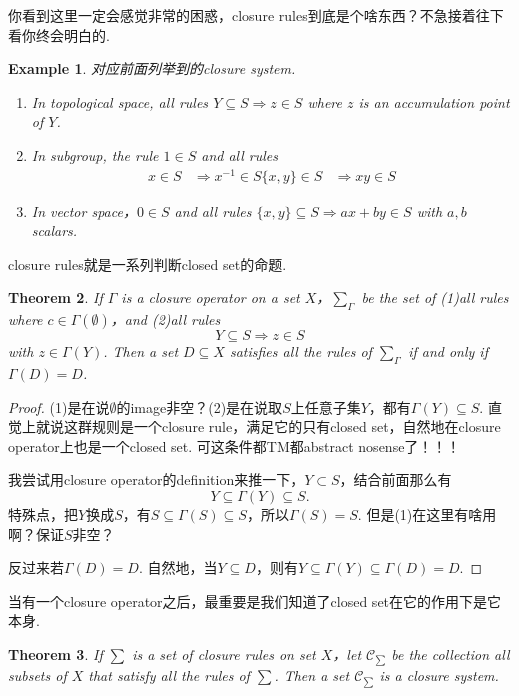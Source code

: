 \documentclass{article}
\newtheorem{theorem}{Theorem}[section]
\newtheorem{example}[theorem]{Example}
\begin{document}
{\color{blue} 你看到这里一定会感觉非常的困惑，closure rules到底是个啥东西？不急接着往下看你终会明白的}.

\begin{example}
\rm 对应前面列举到的closure system.
\begin{enumerate}
	\item In topological space, all rules $Y \subseteq S \Rightarrow z \in S$ where $z$ is an accumulation point of $Y$.  
	\item In subgroup, the rule $1 \in S$ and all rules
	$$
		\begin{aligned}
			x \in S &\Rightarrow x^{-1} \in S
			\{x,y\} \in S &\Rightarrow xy \in S
		\end{aligned}
	$$
	\item In vector space，$0 \in S$ and all rules $\{x,y\} \subseteq S \Rightarrow ax + by \in S$ with $a,b$ scalars. 
\end{enumerate}
\end{example}

{\color{red} closure rules就是一系列判断closed set的命题}.

\begin{theorem}
\rm {\color{red} If $\Gamma$ is a closure operator on a set $X$}，$\sum_{\Gamma}$ be the set of (1)all rules where $c \in \Gamma(\emptyset)$，and (2)all rules
$$
Y \subseteq  S \Rightarrow z \in S
$$
with $z \in \Gamma(Y)$. Then a set $D \subseteq X$ satisfies all the rules of $\sum_\Gamma$ if and only if $\Gamma(D) = D$.
\end{theorem}

\begin{proof}
(1)是在说$\emptyset$的image非空？(2)是在说取$S$上任意子集$Y$，都有$\Gamma(Y) \subseteq S$. 直觉上就说这群规则是一个closure rule，满足它的只有closed set，自然地在closure operator上也是一个closed set. 可这条件都TM都abstract nosense了！！！

我尝试用closure operator的definition来推一下，$Y \subset S$，结合前面那么有
$$
Y \subseteq \Gamma(Y) \subseteq S.
$$
特殊点，把$Y$换成$S$，有$S \subseteq \Gamma(S) \subseteq S$，所以$\Gamma(S) = S$. 但是(1)在这里有啥用啊？保证$S$非空？

反过来若$\Gamma(D) = D$. 自然地，当$Y \subseteq D$，则有$Y \subseteq \Gamma(Y) \subseteq \Gamma(D) =  D$.
\end{proof}

{\color{blue} 当有一个closure operator之后，最重要是我们知道了closed set在它的作用下是它本身}.

\begin{theorem}
\rm {\color{red} If $\sum$ is a set of closure rules on set $X$}，let $\mathcal{C}_{\sum}$ be the collection all subsets of $X$ that satisfy all the rules of $\sum$. Then a set $\mathcal{C}_{\sum}$ is a closure system. 
\end{theorem}
\end{document}
